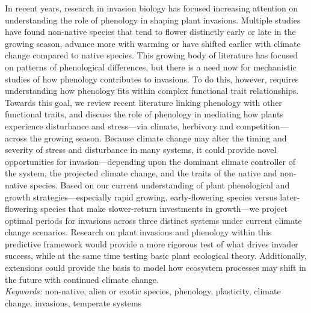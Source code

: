 \documentclass[11pt,a4paper,oneside]{article}
\begin{document}
 In recent years, research in invasion biology has focused increasing attention on understanding the role of phenology in shaping plant invasions. Multiple studies have found non-native species that tend to flower distinctly early or late in the growing season, advance more with warming or have shifted earlier with climate change compared to native species. This growing body of literature has focused on patterns of phenological differences, but there is a need now for mechanistic studies of how phenology contributes to invasions. To do this, however, requires understanding how phenology fits within complex functional trait relationships. Towards this goal, we review recent literature linking phenology with other functional traits, and discuss the role of phenology in mediating how plants experience disturbance and stress---via climate, herbivory and competition---across the growing season. Because climate change may alter the timing and severity of stress and disturbance in many systems, it could provide novel opportunities for invasion---depending upon the dominant climate controller of the system, the projected climate change, and the traits of the native and non-native species. Based on our current understanding of plant phenological and growth strategies---especially rapid growing, early-flowering species versus later-flowering species that make slower-return investments in growth---we project optimal periods for invasions across three distinct systems under current climate change scenarios. Research on plant invasions and phenology within this predictive framework would provide a more rigorous test of what drives invader success, while at the same time testing basic plant ecological theory. Additionally, extensions could provide the basis to model how ecosystem processes may shift in the future with continued climate change. \\

\noindent \emph{Keywords:} non-native, alien or exotic species, phenology, plasticity, climate change, invasions, temperate systems
\end{document}
